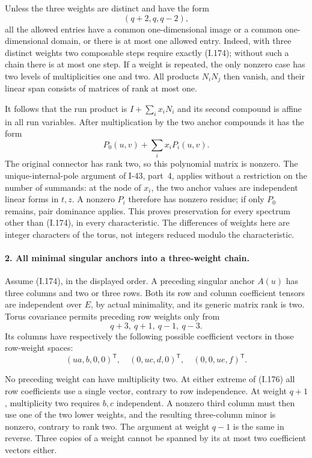 Unless the three weights are distinct and have the form
\[
 (q+2,q,q-2),
 \tag{I.174}
\]
all the allowed entries have a common one-dimensional image
or a common one-dimensional domain, or there is at most one
allowed entry. Indeed, with three distinct weights two
composable steps require exactly (I.174); without such a
chain there is at most one step. If a weight is repeated,
the only nonzero case has two levels of multiplicities one
and two. All products $N_iN_j$ then vanish, and their linear
span consists of matrices of rank at most one.

It follows that the run product is $I+\sum_i x_iN_i$ and
its second compound is affine in all run variables. After
multiplication by the two anchor compounds it has the form
\[
 P_0(u,v)+\sum_i x_iP_i(u,v).
 \tag{I.175}
\]
The original connector has rank two, so this polynomial
matrix is nonzero. The unique-internal-pole argument of
I-43, part~4, applies without a restriction on the number of
summands: at the node of $x_i$, the two anchor values are
independent linear forms in $t,z$. A nonzero $P_i$ therefore
has nonzero residue; if only $P_0$ remains, pair dominance
applies. This proves preservation for every spectrum other
than (I.174), in every characteristic. The differences of
weights here are integer characters of the torus, not
integers reduced modulo the characteristic.

\paragraph{2. All minimal singular anchors into a three-weight chain.}
Assume (I.174), in the displayed order. A preceding singular
anchor $A(u)$ has three columns and two or three rows. Both
its row and column coefficient tensors are independent over
$E$, by actual minimality, and its generic matrix rank is
two. Torus covariance permits preceding row weights only
from
\[
 q+3,\ q+1,\ q-1,\ q-3.
 \tag{I.176}
\]
Its columns have respectively the following possible
coefficient vectors in those row-weight spaces:
\[
 (u a,b,0,0)^{\mathsf T},\quad
 (0,u c,d,0)^{\mathsf T},\quad
 (0,0,u e,f)^{\mathsf T}.
 \tag{I.177}
\]

No preceding weight can have multiplicity two. At either
extreme of (I.176) all row coefficients use a single vector,
contrary to row independence. At weight $q+1$, multiplicity
two requires $b,c$ independent. A nonzero third column must
then use one of the two lower weights, and the resulting
three-column minor is nonzero, contrary to rank two.
The argument at weight $q-1$ is the same in reverse. Three
copies of a weight cannot be spanned by its at most two
coefficient vectors either.

